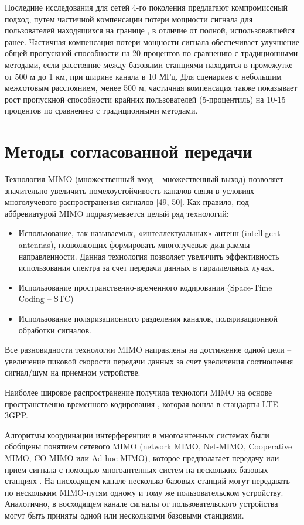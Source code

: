 Последние исследования для сетей 4-го поколения предлагают компромиссный подход, путем частичной компенсации потери мощности сигнала для пользователей находящихся на границе \cite{castellanos2008performance}, в отличие от полной, использовавшейся ранее. Частичная компенсация потери мощности сигнала обеспечивает улучшение общей пропускной способности на 20 процентов по сравнению с традиционными методами, если расстояние между базовыми станциями находится в промежутке от 500 м до 1 км, при ширине канала в 10 МГц. Для сценариев с небольшим межсотовым расстоянием, менее 500 м, частичная компенсация также показывает рост пропускной способности крайних пользователей (5-процентиль) на 10-15 процентов по сравнению с традиционными методами.

\section{Методы согласованной передачи} \label{sect4_2}
Технология MIMO (множественный вход – множественный выход) позволяет значительно увеличить помехоустойчивость каналов связи в условиях многолучевого распространения сигналов [49, 50]. Как правило, под аббревиатурой MIMO подразумевается целый ряд технологий:
\begin{itemize}
\item Использование, так называемых, «интеллектуальных» антенн (intelligent antennas), позволяющих формировать многолучевые диаграммы направленности. Данная технология позволяет увеличить эффективность использования спектра за счет передачи данных в параллельных лучах.
\item Использование пространственно-временного кодирования (Space-Time Coding – STC)
\item Использование поляризационного разделения каналов, поляризационной обработки сигналов.
\end{itemize}

Все разновидности технологии MIMO направлены на достижение одной цели – увеличение пиковой скорости передачи данных за счет увеличения соотношения сигнал/шум на приемном устройстве.

Наиболее широкое распространение получила технологи MIMO на основе пространственно-временного кодирования \cite{oestges2010mimo,3GPPTS2530,3GPPTR25814}, которая вошла в стандарты LTE 3GPP.

Алгоритмы координации интерференции в многоантенных системах были обобщены понятием сетевого MIMO (network MIMO, Net-MIMO, Cooperative MIMO, CO-MIMO или Ad-hoc MIMO), которое предполагает передачу или прием сигнала с помощью многоантенных систем на нескольких базовых станциях \cite{jindal2006mimo}. На нисходящем канале несколько базовых станций могут передавать по нескольким MIMO-путям одному и тому же пользовательском устройству. Аналогично, в восходящем канале сигналы от пользовательского устройства могут быть приняты одной или несколькими базовыми станциями.

